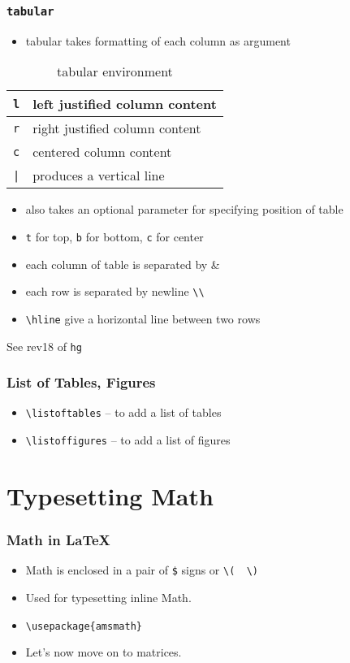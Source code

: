 \documentclass{beamer}
\newcommand{\typ}[1]{\lstinline{#1}}
\begin{document}
\begin{frame}[fragile]
  \frametitle{\lstinline+tabular+}
  \begin{itemize}
  \item tabular takes formatting of each column as argument
  \end{itemize}

  \begin{table}
    \caption{tabular environment}
    
    \begin{tabular}{|l|l|}
      \lstinline+l+ & left justified column content\\\hline
      \lstinline+r+ & right justified column content\\\hline
      \lstinline+c+ & centered column content\\\hline
      \lstinline+|+ & produces a vertical line\\
    \end{tabular}
  \end{table}
  \begin{itemize}
  \item also takes an optional parameter for specifying position of
    table 
  \item \lstinline+t+ for top, \lstinline+b+ for bottom, \lstinline+c+
    for center 
  \item each column of table is separated by \&
  \item each row is separated by newline \lstinline{\\}
  \item \lstinline+\hline+ give a horizontal line between two rows
  \end{itemize}
  \tiny See rev18 of \typ{hg}
\end{frame}

\begin{frame}[fragile]
  \frametitle{List of Tables, Figures}
  \begin{itemize}
  \item \lstinline+\listoftables+ -- to add a list of tables
  \item \lstinline+\listoffigures+ -- to add a list of figures
  \end{itemize}
\end{frame}


\section{Typesetting Math}
\begin{frame}[fragile]
  \frametitle{Math in \LaTeX}
  \begin{itemize}
  \item Math is enclosed in a pair of \lstinline{$} signs or %
    \lstinline+\(  \)+ 
  \item Used for typesetting inline Math. 
  \item \lstinline+\usepackage{amsmath}+
  \item Let's now move on to matrices. 
  \end{itemize}
\end{frame}
\end{document}
